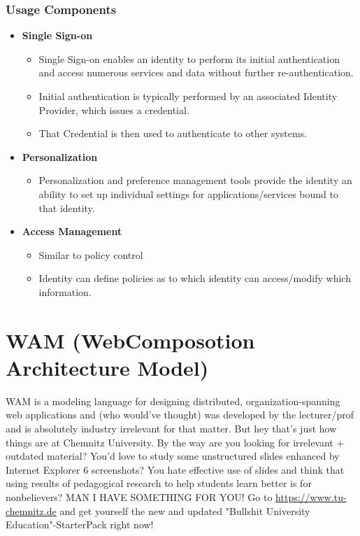 \documentclass[11pt]{article}
\begin{document}
\subsubsection{Usage Components}
\label{sec:org4c02d04}
\begin{itemize}
\item \textbf{Single Sign-on}
\begin{itemize}
\item Single Sign-on enables an identity to perform its initial authentication and access numerous services and data without further re-authentication.
\item Initial authentication is typically performed by an associated Identity Provider, which issues a credential.
\item That Credential is then used to authenticate to other systems.
\end{itemize}
\item \textbf{Personalization}
\begin{itemize}
\item Personalization and preference management tools provide the identity an ability to set up individual settings for applications/services bound to that identity.
\end{itemize}
\item \textbf{Access Management}
\begin{itemize}
\item Similar to policy control
\item Identity can define policies as to which identity can access/modify which information.
\end{itemize}
\end{itemize}
\section{WAM (WebComposotion Architecture Model)}
\label{sec:orgda763ad}
WAM is a modeling language for designing distributed, organization-spanning web applications and (who would've thought) was developed by the lecturer/prof and is absolutely industry irrelevant for that matter. But hey that's just how things are at Chemnitz University. By the way are you looking for irrelevant + outdated material? You'd love to study some unstructured slides enhanced by Internet Explorer 6 screenshots? You hate effective use of slides and think that using results of pedagogical research to help students learn better is for nonbelievers? MAN I HAVE SOMETHING FOR YOU! Go to \url{https://www.tu-chemnitz.de} and get yourself the new and updated "Bullshit University Education"-StarterPack right now!
\end{document}
